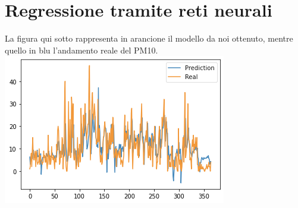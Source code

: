 \documentclass{article}
\begin{document}
\section{Regressione tramite reti neurali}
La figura qui sotto rappresenta in arancione il modello da noi ottenuto, 
mentre quello in blu l'andamento reale del PM10.
\\\includegraphics[scale = 0.5]{Immagini/RegressionePM10.png}
\end{document}
